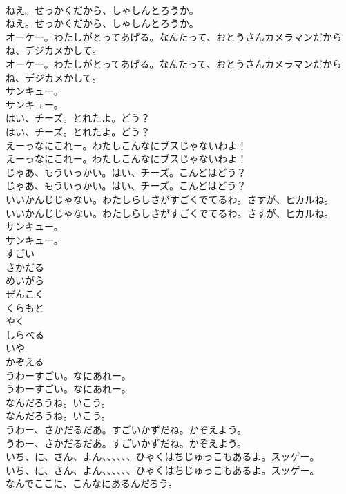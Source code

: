 \documentclass[8pt]{extreport}
\begin{document}
\begin{CJK}{UTF8}{min}
\\	ねえ。せっかくだから、しゃしんとろうか。	
\\	ねえ。せっかくだから、しゃしんとろうか。 
\\	オーケー。わたしがとってあげる。なんたって、おとうさんカメラマンだからね、デジカメかして。	
\\	オーケー。わたしがとってあげる。なんたって、おとうさんカメラマンだからね、デジカメかして。 
\\	サンキュー。	
\\	サンキュー。 
\\	はい、チーズ。とれたよ。どう？	
\\	はい、チーズ。とれたよ。どう？ 
\\	えーっなにこれー。わたしこんなにブスじゃないわよ！	
\\	えーっなにこれー。わたしこんなにブスじゃないわよ！ 
\\	じゃあ、もういっかい。はい、チーズ。こんどはどう？	
\\	じゃあ、もういっかい。はい、チーズ。こんどはどう？ 
\\	いいかんじじゃない。わたしらしさがすごくでてるわ。さすが、ヒカルね。	
\\	いいかんじじゃない。わたしらしさがすごくでてるわ。さすが、ヒカルね。 
\\	サンキュー。	
\\	サンキュー。 
\\	すごい
\\	さかだる
\\	めいがら
\\	ぜんこく
\\	くらもと
\\	やく
\\	しらべる
\\	いや
\\	かぞえる
\\	うわーすごい。なにあれー。	
\\	うわーすごい。なにあれー。 
\\	なんだろうね。いこう。	
\\	なんだろうね。いこう。 
\\	うわー、さかだるだあ。すごいかずだね。かぞえよう。	
\\	うわー、さかだるだあ。すごいかずだね。かぞえよう。 
\\	いち、に、さん、よん、、、、、、ひゃくはちじゅっこもあるよ。スッゲー。	
\\	いち、に、さん、よん、、、、、、ひゃくはちじゅっこもあるよ。スッゲー。 
\\	なんでここに、こんなにあるんだろう。	

\end{CJK}
\end{document}
